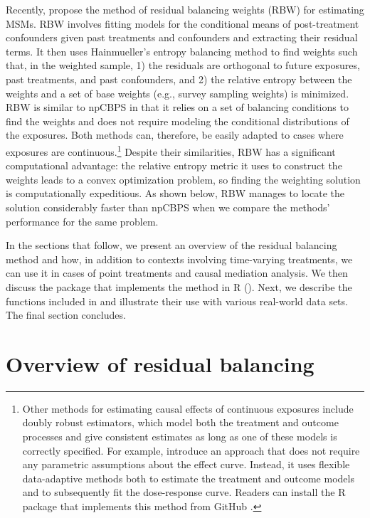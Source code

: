 Recently, \citet{zhouResidualBalancingMethod2020a} propose the method of
residual balancing weights (RBW) for estimating MSMs. RBW involves
fitting models for the conditional means of post-treatment confounders
given past treatments and confounders and extracting their residual
terms. It then uses Hainmueller's
\citeyearpar{hainmuellerEntropyBalancingCausal2012} entropy balancing
method to find weights such that, in the weighted sample, 1) the
residuals are orthogonal to future exposures, past treatments, and past
confounders, and 2) the relative entropy between the weights and a set
of base weights (e.g., survey sampling weights) is minimized. RBW is
similar to npCBPS in that it relies on a set of balancing conditions to
find the weights and does not require modeling the conditional
distributions of the exposures. Both methods can, therefore, be easily
adapted to cases where exposures are continuous.\footnote{Other methods
  for estimating causal effects of continuous exposures include doubly
  robust estimators, which model both the treatment and outcome
  processes and give consistent estimates as long as one of these models
  is correctly specified. For example,
  \citet{kennedyNonparametricMethodsDoubly2017} introduce an approach
  that does not require any parametric assumptions about the effect
  curve. Instead, it uses flexible data-adaptive methods both to
  estimate the treatment and outcome models and to subsequently fit the
  dose-response curve. Readers can install the R package that implements
  this method from GitHub \citep{R-npcausal}.} Despite their
similarities, RBW has a significant computational advantage: the
relative entropy metric it uses to construct the weights leads to a
convex optimization problem, so finding the weighting solution is
computationally expeditious. As shown below, RBW manages to locate the
solution considerably faster than npCBPS when we compare the methods'
performance for the same problem.

In the sections that follow, we present an overview of the residual
balancing method and how, in addition to contexts involving time-varying
treatments, we can use it in cases of point treatments and causal
mediation analysis. We then discuss the package that implements the
method in R (). Next, we describe the functions included in
 and illustrate their use with various real-world data
sets. The final section concludes.

\hypertarget{residual-balancing}{%
\section{Overview of residual balancing}\label{residual-balancing}}

